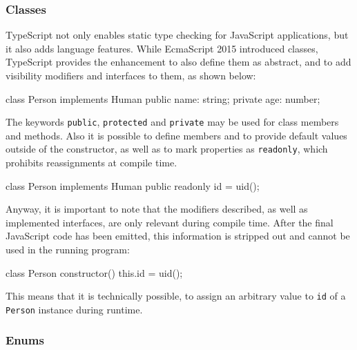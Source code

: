 \subsubsection{Classes}
\label{sec:ts-classes}

TypeScript not only enables static type checking for JavaScript applications, but it also adds language features. While EcmaScript 2015 introduced classes, TypeScript provides the enhancement to also define them as abstract, and to add visibility modifiers and interfaces to them, as shown below:
\begin{JsCode}[numbers=none]
class Person implements Human {
  public name: string;
  private age: number;
}
\end{JsCode}
The keywords \texttt{public}, \texttt{protected} and \texttt{private} may be used for class members and methods. Also it is possible to define members and to provide default values outside of the constructor, as well as to mark properties as \texttt{readonly}, which prohibits reassignments at compile time.
\begin{JsCode}[numbers=none]
class Person implements Human {
  public readonly id = uid();
}
\end{JsCode}
Anyway, it is important to note that the modifiers described, as well as implemented interfaces, are only relevant during compile time. After the final JavaScript code has been emitted, this information is stripped out and cannot be used in the running program:
\begin{JsCode}[numbers=none]
class Person {
  constructor() {
    this.id = uid();
  }
}
\end{JsCode}
This means that it is technically possible, to assign an arbitrary value to \texttt{id} of a \texttt{Person} instance during runtime.

\subsubsection{Enums}
\label{sec:ts-enums}


